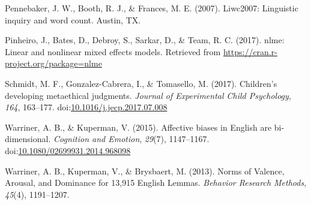 \documentclass[,man]{apa6}
\begin{document}
\leavevmode\hypertarget{ref-Pennebaker2007}{}%
Pennebaker, J. W., Booth, R. J., \& Frances, M. E. (2007). Liwc2007: Linguistic inquiry and word count. Austin, TX.

\leavevmode\hypertarget{ref-Pinheiro2017}{}%
Pinheiro, J., Bates, D., Debroy, S., Sarkar, D., \& Team, R. C. (2017). nlme: Linear and nonlinear mixed effects models. Retrieved from \url{https://cran.r-project.org/package=nlme}

\leavevmode\hypertarget{ref-Schmidt2017}{}%
Schmidt, M. F., Gonzalez-Cabrera, I., \& Tomasello, M. (2017). Children's developing metaethical judgments. \emph{Journal of Experimental Child Psychology}, \emph{164}, 163--177. doi:\href{https://doi.org/10.1016/j.jecp.2017.07.008}{10.1016/j.jecp.2017.07.008}

\leavevmode\hypertarget{ref-Warriner2015}{}%
Warriner, A. B., \& Kuperman, V. (2015). Affective biases in English are bi-dimensional. \emph{Cognition and Emotion}, \emph{29}(7), 1147--1167. doi:\href{https://doi.org/10.1080/02699931.2014.968098}{10.1080/02699931.2014.968098}

\leavevmode\hypertarget{ref-Warriner2013}{}%
Warriner, A. B., Kuperman, V., \& Brysbaert, M. (2013). Norms of Valence, Arousal, and Dominance for 13,915 English Lemmas. \emph{Behavior Research Methods}, \emph{45}(4), 1191--1207.

\endgroup
\end{document}
